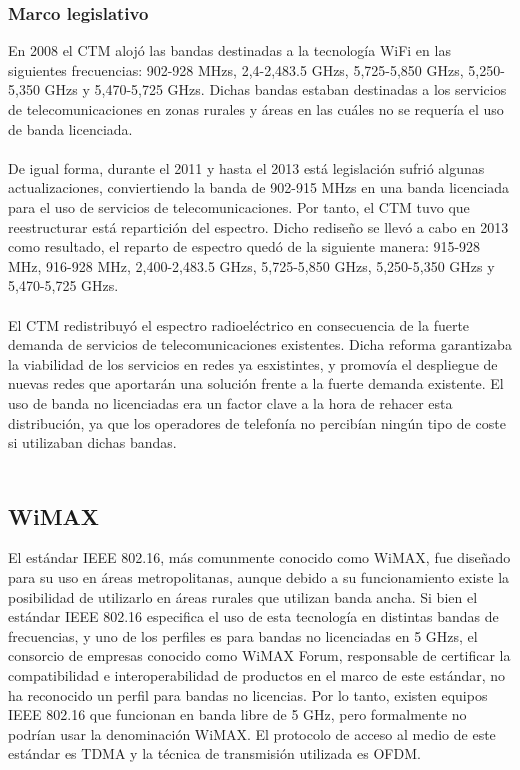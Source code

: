 \subsubsection{Marco legislativo}
En 2008 el CTM alojó las bandas destinadas a la tecnología WiFi en las siguientes frecuencias: 902-928 MHzs, 2,4-2,483.5 GHzs, 5,725-5,850 GHzs, 5,250-5,350 GHzs y 5,470-5,725 GHzs. Dichas bandas estaban destinadas a los servicios de telecomunicaciones en zonas rurales y áreas en las cuáles no se requería el uso de banda licenciada. \\\\

De igual forma, durante el 2011 y hasta el 2013 está legislación sufrió algunas actualizaciones, conviertiendo la banda de 902-915 MHzs en una banda licenciada para el uso de servicios de telecomunicaciones. Por tanto, el CTM tuvo que reestructurar está repartición del espectro. Dicho rediseño se llevó a cabo en 2013 como resultado, el reparto de espectro quedó de la siguiente manera: 915-928 MHz, 916-928 MHz, 2,400-2,483.5 GHzs, 5,725-5,850 GHzs, 5,250-5,350 GHzs y 5,470-5,725 GHzs.\\\\

El CTM redistribuyó el espectro radioeléctrico en consecuencia de la fuerte demanda de servicios de telecomunicaciones existentes. Dicha reforma garantizaba la viabilidad de los servicios en redes ya esxistintes, y promovía el despliegue de nuevas redes que aportarán una solución frente a la fuerte demanda existente. El uso de banda no licenciadas era un factor clave a la hora de rehacer esta distribución, ya que los operadores de telefonía no percibían ningún tipo de coste si utilizaban dichas bandas.\\\\

		
\subsection{WiMAX}
El estándar IEEE 802.16, más comunmente conocido como WiMAX, fue diseñado para su uso en áreas metropolitanas, aunque debido a su funcionamiento existe la posibilidad de utilizarlo en áreas rurales que utilizan banda ancha. Si bien el estándar IEEE 802.16 especifica el uso de esta tecnología en distintas bandas de frecuencias, y uno de los perfiles es para bandas no licenciadas en 5 GHzs, el consorcio de empresas conocido como WiMAX Forum, responsable de certificar la compatibilidad e interoperabilidad de productos en el marco de este estándar, no ha reconocido un perfil para bandas no licencias. Por lo tanto, existen equipos IEEE 802.16 que funcionan en banda libre de 5 GHz, pero formalmente no podrían usar la denominación WiMAX. El protocolo de acceso al medio de este estándar es TDMA y la técnica de transmisión utilizada es OFDM.\\\\

